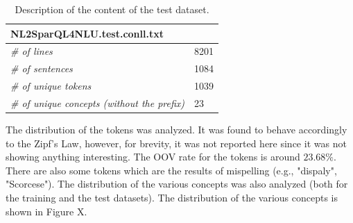 \documentclass[11pt,a4paper]{article}
\begin{document}
\begin{table}[h]
\centering
\begin{tabular}{|l|l|}
\hline
\multicolumn{2}{|l|}{\textbf{NL2SparQL4NLU.test.conll.txt}} \\ \hline
\textit{\# of lines}									& 8201 \\ \hline
\textit{\# of sentences}                             & 1084 \\ \hline
\textit{\# of unique tokens}                         & 1039 \\ \hline
\textit{\# of unique concepts (without the prefix)}  & 23   \\ \hline
\end{tabular}
\caption{Description of the content of the test dataset.}
\label{tab:test-dataset-description}
\end{table} 

The distribution of the tokens was analyzed. It was found to behave accordingly to the
Zipf's Law, however, for brevity, it was not reported here since it was not showing 
anything interesting. The OOV rate for the tokens is around $23.68\%$. There are also
some tokens which are the results of mispelling (e.g., "dispaly", "Scorcese").
The distribution of the various concepts was also analyzed (both for the training
and the test datasets). The distribution of the various concepts is shown in Figure X.
\end{document}
